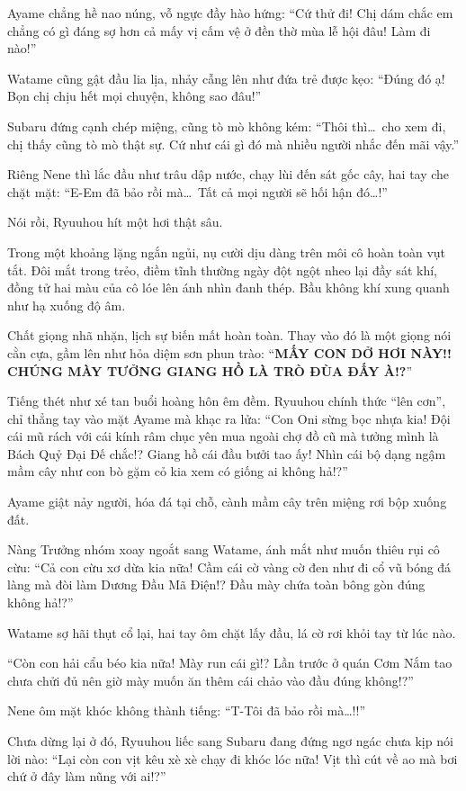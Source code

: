 \documentclass[../main.tex]{subfiles}
\begin{document}
Ayame chẳng hề nao núng, vỗ ngực đầy hào hứng: ``Cứ thử đi! Chị dám chắc em chẳng có gì đáng sợ hơn cả mấy vị cấm vệ ở đền thờ mùa lễ hội đâu! Làm đi nào!''

Watame cũng gật đầu lia lịa, nhảy cẫng lên như đứa trẻ được kẹo: ``Đúng đó ạ! Bọn chị chịu hết mọi chuyện, không sao đâu!''

Subaru đứng cạnh chép miệng, cũng tò mò không kém: ``Thôi thì\dots\ cho xem đi, chị thấy cũng tò mò thật sự. Cứ như cái gì đó mà nhiều người nhắc đến mãi vậy.''

Riêng Nene thì lắc đầu như trâu dập nước, chạy lùi đến sát gốc cây, hai tay che chặt mặt: ``E-Em đã bảo rồi mà\dots\ Tất cả mọi người sẽ hối hận đó\dots!''

Nói rồi, Ryuuhou hít một hơi thật sâu.

Trong một khoảng lặng ngắn ngủi, nụ cười dịu dàng trên môi cô hoàn toàn vụt tắt. Đôi mắt trong trẻo, điềm tĩnh thường ngày đột ngột nheo lại đầy sát khí, đồng tử hai màu của cô lóe lên ánh nhìn đanh thép. Bầu không khí xung quanh như hạ xuống độ âm.

Chất giọng nhã nhặn, lịch sự biến mất hoàn toàn. Thay vào đó là một giọng nói cằn cựa, gầm lên như hỏa diệm sơn phun trào: ``\textbf{MẤY CON DỞ HƠI NÀY!! CHÚNG MÀY TƯỞNG GIANG HỒ LÀ TRÒ ĐÙA ĐẤY À!?}''

Tiếng thét như xé tan buổi hoàng hôn êm đềm. Ryuuhou chính thức ``lên cơn'', chỉ thẳng tay vào mặt Ayame mà khạc ra lửa: ``Con Oni sừng bọc nhựa kia! Đội cái mũ rách với cái kính râm chục yên mua ngoài chợ đồ cũ mà tưởng mình là Bách Quỷ Đại Đế chắc!? Giang hồ cái đầu bưởi tao ấy! Nhìn cái bộ dạng ngậm mầm cây như con bò gặm cỏ kia xem có giống ai không hả!?''

Ayame giật nảy người, hóa đá tại chỗ, cành mầm cây trên miệng rơi bộp xuống đất.

Nàng Trưởng nhóm xoay ngoắt sang Watame, ánh mắt như muốn thiêu rụi cô cừu: ``Cả con cừu xơ dừa kia nữa! Cầm cái cờ vàng cờ đen như đi cổ vũ bóng đá làng mà đòi làm Dương Đầu Mã Điện!? Đầu mày chứa toàn bông gòn đúng không hả!?''

Watame sợ hãi thụt cổ lại, hai tay ôm chặt lấy đầu, lá cờ rơi khỏi tay từ lúc nào.

``Còn con hải cẩu béo kia nữa! Mày run cái gì!? Lần trước ở quán Cơm Nắm tao chưa chửi đủ nên giờ mày muốn ăn thêm cái chảo vào đầu đúng không!?''

Nene ôm mặt khóc không thành tiếng: ``T-Tôi đã bảo rồi mà\dots!!''

Chưa dừng lại ở đó, Ryuuhou liếc sang Subaru đang đứng ngơ ngác chưa kịp nói lời nào: ``Lại còn con vịt kêu xè xè chạy đi khóc lóc nữa! Vịt thì cút về ao mà bơi chứ ở đây làm nũng với ai!?''
\end{document}
